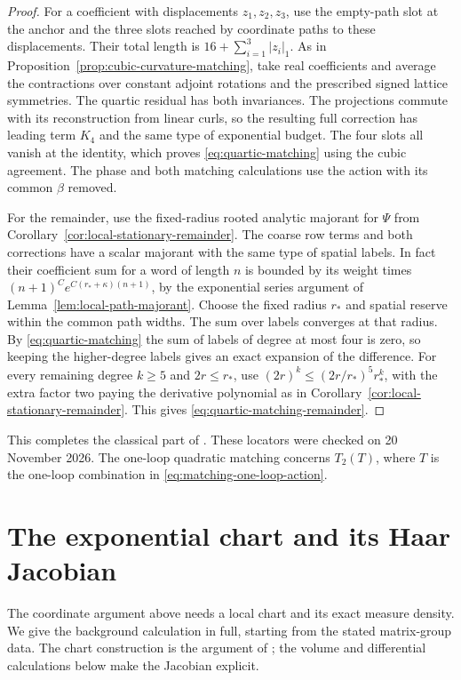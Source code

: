 \documentclass[11pt,reqno]{amsart}
\numberwithin{equation}{section}
\theoremstyle{definition}
\theoremstyle{remark}
\begin{document}
\begin{proof}
For a coefficient with displacements \(z_1,z_2,z_3\), use
the empty-path slot at the anchor and the three slots
reached by coordinate paths to these displacements.
Their total length is \(16+\sum_{i=1}^3|z_i|_1\).
As in Proposition~\ref{prop:cubic-curvature-matching},
take real coefficients and average the contractions over
constant adjoint rotations and the prescribed signed lattice
symmetries. The quartic residual has both invariances.
The projections commute with its reconstruction from linear
curls, so the resulting full correction has leading term \(K_4\)
and the same type of exponential budget. The four slots all
vanish at the identity, which proves \eqref{eq:quartic-matching}
using the cubic agreement. The phase and both matching
calculations use the action with its common \(\beta\) removed.

For the remainder, use the fixed-radius rooted analytic
majorant for \(\Psi\) from
Corollary~\ref{cor:local-stationary-remainder}. The coarse
row terms and both corrections have a scalar majorant with
the same type of spatial labels. In fact their coefficient
sum for a word of length \(n\) is bounded by its weight
times \((n+1)^C e^{C(r_*+\kappa)(n+1)}\), by the
exponential series argument of
Lemma~\ref{lem:local-path-majorant}. Choose the fixed radius
\(r_*\) and spatial reserve within the common path widths.
The sum over labels converges at that radius. By
\eqref{eq:quartic-matching} the sum of labels of degree at
most four is zero, so keeping the higher-degree labels
gives an exact expansion of the difference. For every
remaining degree \(k\ge5\) and \(2r\le r_*\), use
\((2r)^k\le(2r/r_*)^5r_*^k\), with the extra factor two
paying the derivative polynomial as in
Corollary~\ref{cor:local-stationary-remainder}.
This gives \eqref{eq:quartic-matching-remainder}.
\end{proof}

This completes the classical part of
\cite[Proposition~36.6 and (36.8)--(36.12), pp.~240--243]{Main}.
These locators were checked on 20 November 2026.
The one-loop quadratic matching concerns \(T_2(T)\),
where \(T\) is the one-loop combination in
\eqref{eq:matching-one-loop-action}.

\appendix
\section{The exponential chart and its Haar Jacobian}
\label{app:haar}

The coordinate argument above needs a local chart and its exact
measure density. We give the background calculation in full,
starting from the stated matrix-group data. The chart construction
is the argument of \cite[Lemma~1.2, pp.~12--13]{Main}; the volume
and differential calculations below make the Jacobian explicit.
\end{document}
